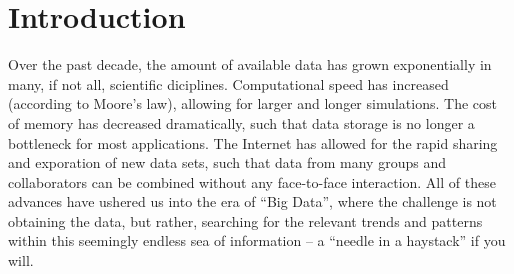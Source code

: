 
\chapter{Introduction\label{ch:intro}}

Over the past decade, the amount of available data has grown exponentially in many, if not all, scientific diciplines. 
%
Computational speed has increased (according to Moore's law), allowing for larger and longer simulations.
%
The cost of memory has decreased dramatically, such that data storage is no longer a bottleneck for most applications. 
%
The Internet has allowed for the rapid sharing and exporation of new data sets, such that data from many groups and collaborators can be combined without any face-to-face interaction. 
%
All of these advances have ushered us into the era of ``Big Data'', where the challenge is not obtaining the data, but rather, searching for the relevant trends and patterns within this seemingly endless sea of information -- a ``needle in a haystack'' if you will. 

